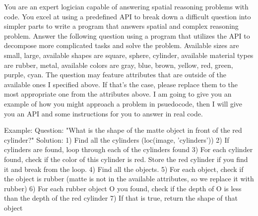 \begin{figure*}[t]
\centering
\begin{prompt}
You are an expert logician capable of answering spatial reasoning problems with code. You excel at using a predefined API to break down a difficult question into simpler parts to write a program that answers spatial and complex reasoning problem.
Answer the following question using a program that utilizes the API to decompose more complicated tasks and solve the problem. 
Available sizes are {{small, large}}, available shapes are {{square, sphere, cylinder}}, available material types are {{rubber, metal}}, available colors are {{gray, blue, brown, yellow, red, green, purple, cyan}}.
The question may feature attributes that are outside of the available ones I specified above. If that's the case, please replace them to the most appropriate one from the attributes above.
I am going to give you an example of how you might approach a problem in psuedocode, then I will give you an API and some instructions for you to answer in real code.

Example:
Question: "What is the shape of the matte object in front of the red cylinder?"
Solution:
1) Find all the cylinders (loc(image, 'cylinders'))
2) If cylinders are found, loop through each of the cylinders found
3) For each cylinder found, check if the color of this cylinder is red. Store the red cylinder if you find it and break from the loop.
4) Find all the objects.
5) For each object, check if the object is rubber (matte is not in the available attributes, so we replace it with rubber)
6) For each rubber object O you found, check if the depth of O is less than the depth of the red cylinder
7) If that is true, return the shape of that object


\end{prompt}
\end{figure*}
